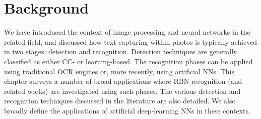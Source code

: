 \chapter{Background}
\label{ch:background}


We have introduced the context of image processing and neural networks in the related field, and discussed how text capturing within photos is typically achieved in two stages: detection and recognition. Detection techniques are generally classified as either CC- or learning-based. The recognition phases can be applied using traditional OCR engines or, more recently, using artificial NNs. This chapter surveys a number of broad applications where RBN recognition (and related works) are investigated using such phases. The various detection and recognition techniques discussed in the literature are also detailed. We also broadly define the applications of artificial deep-learning NNs in these contexts.





